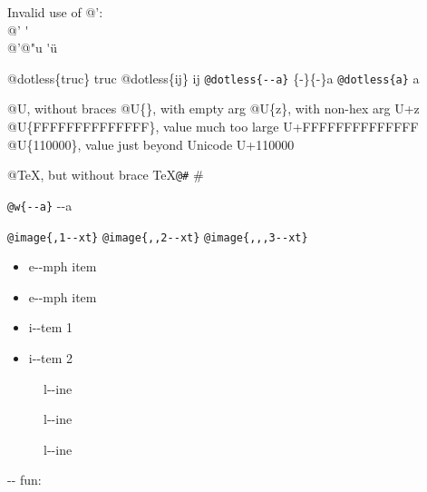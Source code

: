 \documentclass{book}
\begin{document}
Invalid use of @':\leavevmode{}\\
@' \'{}
\leavevmode{}\\
@'@"u \'{}\"{u}

@dotless\{truc\} truc
@dotless\{ij\} ij
\texttt{@dotless\{{-}{-}a\}} \{-\}\{-\}a
\texttt{@dotless\{a\}} a

@U, without braces @U\{\}, with empty arg 
@U\{z\}, with non-hex arg U+z
@U\{FFFFFFFFFFFFFF\}, value much too large U+FFFFFFFFFFFFFF
@U\{110000\}, value just beyond Unicode U+110000

@TeX, but without brace \TeX{}\texttt{@\#} \#

\texttt{@w\{{-}{-}a\}} \hbox{{-}{-}a}

\texttt{@image\{,1{-}{-}xt\}} 
\texttt{@image\{,,2{-}{-}xt\}} 
\texttt{@image\{,,,3{-}{-}xt\}} 


\begin{itemize}[label=\emph{}]
\item e{-}{-}mph item
\end{itemize}

\begin{itemize}[label=\emph{} after emph]
\item e{-}{-}mph item
\end{itemize}

\begin{itemize}[label=\textbullet{} a{-}{-}n itemize line]
\item i{-}{-}tem 1
\item i{-}{-}tem 2
\end{itemize}

\begin{description}
\item[{\parbox[b]{\linewidth}{%
a}}]
l{-}{-}ine
\end{description}

\begin{description}
\item[{\parbox[b]{\linewidth}{%
a{-}{-}missing style formatting}}]
l{-}{-}ine
\end{description}

\begin{description}
\item[{\parbox[b]{\linewidth}{%
a\\
\index[fn]{a@\texttt{a}}%
\index[cp]{index entry between item and itemx}%
b
\index[fn]{b@\texttt{b}}%
}}]
l{-}{-}ine
\end{description}

\hbox{}{-}{-} fun: 
\end{document}
